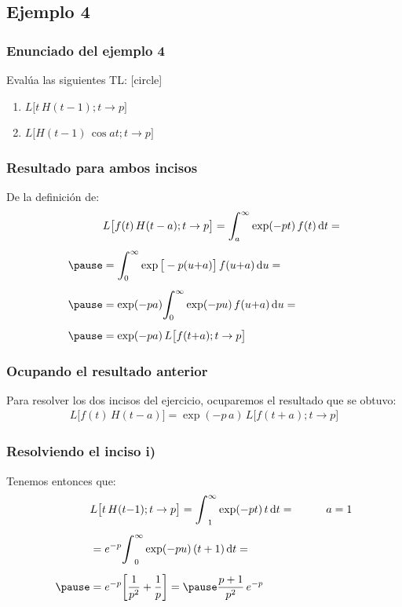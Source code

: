 \documentclass[12pt]{beamer}
\begin{document}
\subsection{Ejemplo 4}

\begin{frame}
\frametitle{Enunciado del ejemplo 4}
Evalúa las siguientes TL:
\pause
{}
[circle]
\begin{enumerate}[<+->]
\item $L \big[ t \, H(t - 1); t \to p \big]$
\item $L \big[ H(t - 1) \, \cos a t; t \to p \big]$
\end{enumerate}
\end{frame}
\begin{frame}
\frametitle{Resultado para ambos incisos}
De la definición de:
\pause
\begin{eqnarray*}
\begin{aligned}
&L \big[ f(t) \, H (t - a); t \to p \big] = \scaleint{6ex}_{\bs a}^{\infty} \exp(- p t) \, f(t) \dd{t} = \\[0.5em] \pause
&=  \scaleint{6ex}_{\bs 0}^{\infty} \exp\big[ - p (u {+} a) \big] \, f(u {+} a) \dd{u} = \\[0.5em] \pause
&= \exp(- p a) \scaleint{6ex}_{\bs 0}^{\infty} \exp(- p u) \, f(u {+} a) \dd{u} = \\[0.5em] \pause
&= \exp(- p a) \, L \big[ f (t {+} a); t \to p \big]
\end{aligned}
\end{eqnarray*}
\end{frame}
\begin{frame}
\frametitle{Ocupando el resultado anterior}
Para resolver los dos incisos del ejercicio, ocuparemos el resultado que se obtuvo:
\pause
\begin{align*}
L \big[ f(t) \, H (t{-} a) \big] = \exp(- p \, a) \, L \big[ f (t {+} a); t \to p \big]    
\end{align*}
\end{frame}
\begin{frame}
\frametitle{Resolviendo el inciso i)}
Tenemos entonces que:
\pause
\begin{eqnarray*}
\begin{aligned}
&L \big[ t \, H(t {-} 1); t \to p \big] = \scaleint{6ex}_{1}^{\infty} \exp(- p t) \, t \dd{t} = \hspace{1cm} a = 1 \\[0.5em]
&= e^{-p} \scaleint{6ex}_{0}^{\infty} \exp(- p u) \, (t + 1) \dd{t} = \\[0.5em] \pause
&= e^{-p} \bigg[ \dfrac{1}{p^{2}} + \dfrac{1}{p} \bigg] = \pause \dfrac{p + 1}{p^{2}} \, e^{-p}
\end{aligned}
\end{eqnarray*}
\end{frame}
\end{document}
